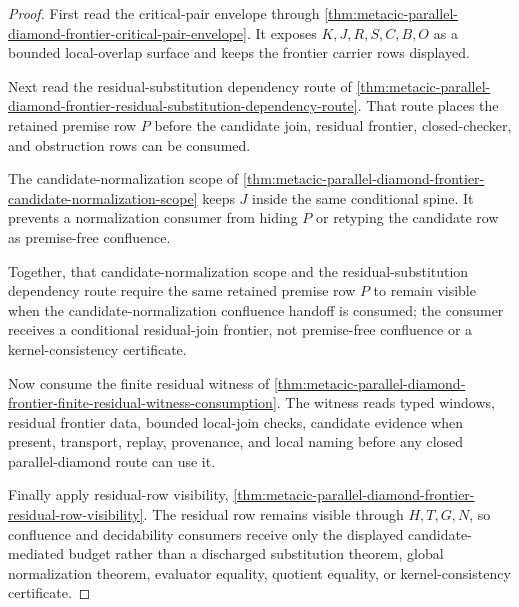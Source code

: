 \begin{proof}
First read the critical-pair envelope through \autoref{thm:metacic-parallel-diamond-frontier-critical-pair-envelope}. It exposes $K,J,R,S,C,B,O$ as a bounded local-overlap surface and keeps the frontier carrier rows displayed.

Next read the residual-substitution dependency route of \autoref{thm:metacic-parallel-diamond-frontier-residual-substitution-dependency-route}. That route places the retained premise row $P$ before the candidate join, residual frontier, closed-checker, and obstruction rows can be consumed.

The candidate-normalization scope of \autoref{thm:metacic-parallel-diamond-frontier-candidate-normalization-scope} keeps $J$ inside the same conditional spine. It prevents a normalization consumer from hiding $P$ or retyping the candidate row as premise-free confluence.

Together, that candidate-normalization scope and the residual-substitution dependency route require the same retained premise row $P$ to remain visible when the candidate-normalization confluence handoff is consumed; the consumer receives a conditional residual-join frontier, not premise-free confluence or a kernel-consistency certificate.

Now consume the finite residual witness of \autoref{thm:metacic-parallel-diamond-frontier-finite-residual-witness-consumption}. The witness reads typed windows, residual frontier data, bounded local-join checks, candidate evidence when present, transport, replay, provenance, and local naming before any closed parallel-diamond route can use it.

Finally apply residual-row visibility, \autoref{thm:metacic-parallel-diamond-frontier-residual-row-visibility}. The residual row remains visible through $H,T,G,N$, so confluence and decidability consumers receive only the displayed candidate-mediated budget rather than a discharged substitution theorem, global normalization theorem, evaluator equality, quotient equality, or kernel-consistency certificate.
\end{proof}

